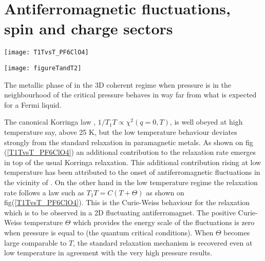 \documentclass[11pt]{article} %
\begin{document}
\section{Antiferromagnetic fluctuations, spin and charge sectors}
\label{Antiferromagnetic fluctuations, spin and charge sectors}

\begin{figure*}[t]	
\centerline{ \texttt{[image: T1TvsT\_PF6ClO4]}}
\caption{Plot of the nuclear relaxation versus temperature according to the data of reference \cite{Creuzet87}. A Korringa regime, $T_{1}T$ = const is observed down to $25 K$. The 2D AF regime is observed below $\approx 15 K$ and the small Curie-Weiss temperature of the 9 kbar run is the signature of the contribution of  quantum critical fluctuations to the nuclear relaxation. The Curie-Weiss temperature becomes zero at the QCP. These data show that the QCP should be slightly below 9 kbar with the present pressure scale. The inset shows that the organic superconductor \tmc at ambient pressure is very close to fulfill  quantum critical conditions.}
\label{T1TvsT_PF6ClO4} 
\end{figure*}
\begin{figure*}[htbp]	
\centerline{ \texttt{[image: figureTandT2]}}
\caption{A log-log plot of the inelastic  longitudinal resistivity of   below $20$ K, according to ref\cite{Doiron09}.}
\label{figureTandT2}  
\end{figure*}

 The  metallic phase of   in the 3D coherent regime when pressure is in the neighbourhood of the critical pressure \pc behaves in way far from what is expected  for a  Fermi liquid. 

The canonical Korringa law , $1/T_{1}T \propto {\chi^{2} (q=0,T)} $, is well obeyed at high temperature say, above 25 K, but the low temperature behaviour deviates strongly from the standard relaxation in paramagnetic metals. As shown on fig (\ref{T1TvsT_PF6ClO4}) an additional contribution to the relaxation rate emerges in top of  the usual Korringa relaxation. This additional contribution  rising at low temperature  has been attributed to the onset of antiferromagnetic fluctuations in the vicinity of \pc\cite{Doiron09,Doiron10,Bourbonnais11}. On the other hand in the low temperature regime the relaxation rate follows a law such as $T_{1}T=C(T+\Theta)$ as shown  on fig(\ref{T1TvsT_PF6ClO4}). This is the Curie-Weiss behaviour for the relaxation which  is to be observed in a 2D fluctuating antiferromagnet\cite{Brown08,Wu05,Moriya00,Bourbonnais09}.
The positive Curie-Weiss temperature $\Theta$ which provides the energy scale of the fluctuations is zero when pressure is equal to \pc (the quantum critical conditions).  When $\Theta$ becomes large comparable to $T$, the standard relaxation mechanism is recovered even at low temperature in agreement with the very high pressure results\cite{Wzietek93}. 
\end{document}
